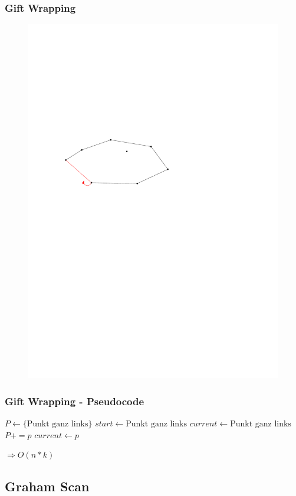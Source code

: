 \begin{frame}
	\frametitle{{Gift Wrapping}}
\begin{figure}[htbp]
	\begin{center}
  	\includegraphics[width=.8\linewidth]{bilder/giftwrap7}
	\end{center}
\end{figure}
\end{frame}


\begin{frame}
	\frametitle{{Gift Wrapping - Pseudocode}}
	\begin{algorithmic}
\State $P\gets \{\mbox{Punkt ganz links}\}$
\State $start\gets \mbox{Punkt ganz links}$
\State $current\gets \mbox{Punkt ganz links}$
\pause
\Repeat 
			\State $P += p$
			\State $current \gets p$
		\EndIf
	\EndFor
{}
\end{algorithmic}
\pause
$\Rightarrow O(n*k)$
\end{frame}

\subsection{Graham Scan}

